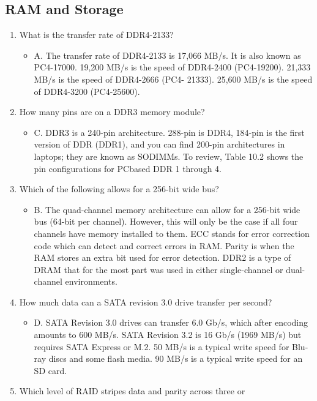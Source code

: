 \documentclass{article}
\begin{document}
\subsection{RAM and Storage} 
\begin{enumerate}
    \item What is the transfer rate of DDR4-2133?
    \begin{itemize}
        \item A. The transfer rate of DDR4-2133 is 17,066
MB/s. It is also known as PC4-17000. 19,200
MB/s is the speed of DDR4-2400 (PC4-19200).
21,333 MB/s is the speed of DDR4-2666 (PC4-
21333). 25,600 MB/s is the speed of DDR4-3200
(PC4-25600).
    \end{itemize}
    \item How many pins are on a DDR3 memory module?
    \begin{itemize}
        \item C. DDR3 is a 240-pin architecture. 288-pin is
DDR4, 184-pin is the first version of DDR
(DDR1), and you can find 200-pin architectures in
laptops; they are known as SODIMMs. To review,
Table 10.2 shows the pin configurations for PCbased
DDR 1 through 4.
    \end{itemize}
    \item Which of the following allows for a 256-bit wide
bus?
    \begin{itemize}
        \item B. The quad-channel memory architecture can
allow for a 256-bit wide bus (64-bit per channel).
However, this will only be the case if all four
channels have memory installed to them. ECC
stands for error correction code which can detect
and correct errors in RAM. Parity is when the
RAM stores an extra bit used for error detection.
DDR2 is a type of DRAM that for the most part
was used in either single-channel or dual-channel
environments.
    \end{itemize}
    \item How much data can a SATA revision 3.0 drive transfer per
second?
    \begin{itemize}
        \item D. SATA Revision 3.0 drives can transfer 6.0 Gb/s, which after
encoding amounts to 600 MB/s. SATA Revision 3.2 is 16 Gb/s
(1969 MB/s) but requires SATA Express or M.2. 50 MB/s is a
typical write speed for Blu-ray discs and some flash media. 90
MB/s is a typical write speed for an SD card.
    \end{itemize}
    \item Which level of RAID stripes data and parity across three or

\end{enumerate}
\end{document}
